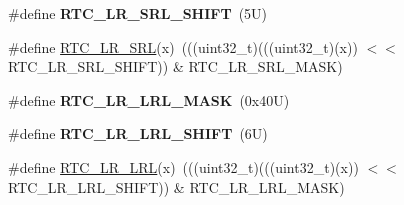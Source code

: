 \begin{DoxyCompactItemize}
\#define {\bfseries R\+T\+C\+\_\+\+L\+R\+\_\+\+S\+R\+L\+\_\+\+S\+H\+I\+FT}~(5\+U)
\item 
\#define \mbox{\hyperlink{group___r_t_c___register___masks_ga22b30e792eed5423fdf1c23a28964d1a}{R\+T\+C\+\_\+\+L\+R\+\_\+\+S\+RL}}(x)~(((uint32\+\_\+t)(((uint32\+\_\+t)(x)) $<$$<$ R\+T\+C\+\_\+\+L\+R\+\_\+\+S\+R\+L\+\_\+\+S\+H\+I\+FT)) \& R\+T\+C\+\_\+\+L\+R\+\_\+\+S\+R\+L\+\_\+\+M\+A\+SK)
\item 
\mbox{\label{group___r_t_c___register___masks_gaf57761c6f1eb820b0d6764ae63e7dfcf}} 
\#define {\bfseries R\+T\+C\+\_\+\+L\+R\+\_\+\+L\+R\+L\+\_\+\+M\+A\+SK}~(0x40\+U)
\item 
\mbox{\label{group___r_t_c___register___masks_ga723a045710e5df92a5bf5363e8cea08f}} 
\#define {\bfseries R\+T\+C\+\_\+\+L\+R\+\_\+\+L\+R\+L\+\_\+\+S\+H\+I\+FT}~(6\+U)
\item 
\#define \mbox{\hyperlink{group___r_t_c___register___masks_ga084591e0d6eba0d2f8082e3edc7ed45e}{R\+T\+C\+\_\+\+L\+R\+\_\+\+L\+RL}}(x)~(((uint32\+\_\+t)(((uint32\+\_\+t)(x)) $<$$<$ R\+T\+C\+\_\+\+L\+R\+\_\+\+L\+R\+L\+\_\+\+S\+H\+I\+FT)) \& R\+T\+C\+\_\+\+L\+R\+\_\+\+L\+R\+L\+\_\+\+M\+A\+SK)
\end{DoxyCompactItemize}
